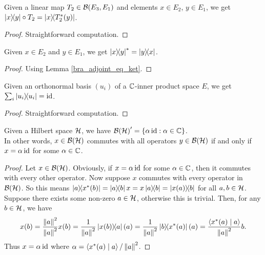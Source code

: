  \begin{corollary}\label{rankOne_comp_linearMap}\leanok
  Given a linear map $T_2\in\mathcal{B}(E_3,E_1)$ and elements $x\in E_2$, $y\in E_1$, we get $\left\lvert x\right\rangle\!\!\left\langle y\right\rvert\circ T_2=\left\lvert x\right\rangle\!\!\left\langle T_2^*(y)\right\rvert$.
 \end{corollary}
 \begin{proof}\leanok
  Straightforward computation.
 \end{proof}
 
 \begin{corollary}\label{rankOne_adjoint}\leanok
  Given $x\in E_2$ and $y\in E_1$, we get $\left\lvert x\right\rangle\!\!\left\langle y\right\rvert^*=\left\lvert y\right\rangle\!\!\left\langle x\right\rvert$.
 \end{corollary}
 \begin{proof}\leanok
  Using Lemma \ref{bra_adjoint_eq_ket}.
 \end{proof}

 \begin{lemma}\label{sum_rankOne_onb_eq_id}\leanok
  Given an orthonormal basis $(u_i)$ of a $\mathbb{C}$-inner product space $E$, we get $\sum_i\left\lvert u_i\right\rangle\!\!\left\langle u_i\right\rvert=\operatorname{id}$.
 \end{lemma}
 \begin{proof}\leanok
  Straightforward computation.
 \end{proof}

 \begin{lemma}\label{ContinuousLinearMap.centralizer}\leanok
  Given a Hilbert space $\mathcal{H}$, we have ${\mathcal{B}(\mathcal{H})}^\prime=\{\alpha\operatorname{id}:\alpha\in\mathbb{C}\}$.\\
  In other words, $x\in\mathcal{B}(\mathcal{H})$ commutes with all operators $y\in\mathcal{B}(\mathcal{H})$ if and only if $x=\alpha\operatorname{id}$ for some $\alpha\in\mathbb{C}$.
 \end{lemma}
 \begin{proof}\leanok
  Let $x\in\mathcal{B}(\mathcal{H})$. Obviously, if $x=\alpha\operatorname{id}$ for some $\alpha\in\mathbb{C}$, then it commutes with every other operator. Now suppose $x$ commutes with every operator in $\mathcal{B}(\mathcal{H})$.
  So this means $\ketbra{a}{x^*(b)}=\ketbra{a}{b}x=x\ketbra{a}{b}=\ketbra{x(a)}{b}$ for all $a,b\in\mathcal{H}$.
  Suppose there exists some non-zero $a\in\mathcal{H}$, otherwise this is trivial. Then, for any $b\in\mathcal{H}$, we have
  \[x(b)=\frac{\left\|a\right\|^2}{\left\|a\right\|^2}x(b)=\frac{1}{\left\|a\right\|^2}\left\lvert x(b)\right\rangle\!\!\left\langle a\right\rvert(a)=\frac{1}{\left\|a\right\|^2}\left\lvert b\right\rangle\!\!\left\langle x^*(a)\right\rvert(a)=\frac{\left\langle x^*(a) \mid a\right\rangle}{\left\|a\right\|^2}b.\]
  Thus $x=\alpha\operatorname{id}$ where $\alpha=\left\langle x^*(a) \mid a\right\rangle/\left\|a\right\|^2$.
 \end{proof}

